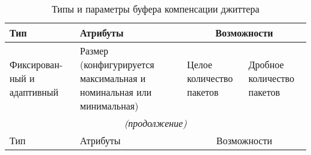 \begin{longtable}{|p{3cm}||p{4cm}|p{4cm}|p{3.5cm}|}
\caption{Типы и параметры буфера компенсации джиттера}\label{TypeBuff}
    \hline
    Тип         & Атрибуты    & \multicolumn{2}{c|}{Возможности}  \\ \hline 
    Фиксирован- ный и адаптивный & Размер (конфигурируется максимальная и номинальная или минимальная) & Целое количество пакетов                                                     & Дробное количество пакетов         \\  \hline \hline
    \endfirsthead   \hline
 \multicolumn{4}{|c|}{\small\slshape (продолжение)}        \\ \hline
 Тип                        & Атрибуты                                                            & \multicolumn{2}{c|}{Возможности}     \\ \hline 
        

\end{longtable}
